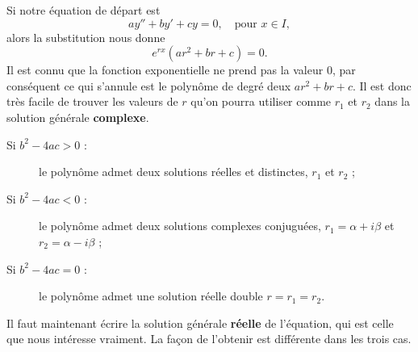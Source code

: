Si notre équation de départ est
\begin{equation}\label{eq_lin_ordre_deux_hom}
	ay'' + by' + cy = 0, \quad\text{pour } x\in I,
\end{equation}
alors la substitution nous donne
\[
	e^{rx}\left(ar^2+br+c\right)=0.
\]
Il est connu que la fonction exponentielle ne prend pas la valeur $0$, par conséquent ce qui s'annule est le polynôme de degré deux $ar^2+br+c$. Il est donc très facile de trouver les valeurs de $r$ qu'on pourra utiliser comme $r_1$ et $r_2$ dans la solution générale \textbf{complexe}.
\begin{description}
	\item[Si $b^2 - 4ac >0$ :] le polynôme admet deux solutions réelles et distinctes, $r_1$ et $r_2$ ;
	\item[Si $b^2 - 4ac <0$ :] le polynôme admet deux solutions complexes conjuguées, $r_1 = \alpha + i \beta$ et $r_2 = \alpha - i \beta$ ;
	\item[Si $b^2 - 4ac =0$ :] le polynôme admet une solution réelle double $r=r_1 = r_2$.
\end{description}
Il faut maintenant écrire la solution générale \textbf{réelle} de l'équation, qui est celle que nous intéresse vraiment. La façon de l'obtenir est différente dans les trois cas.
